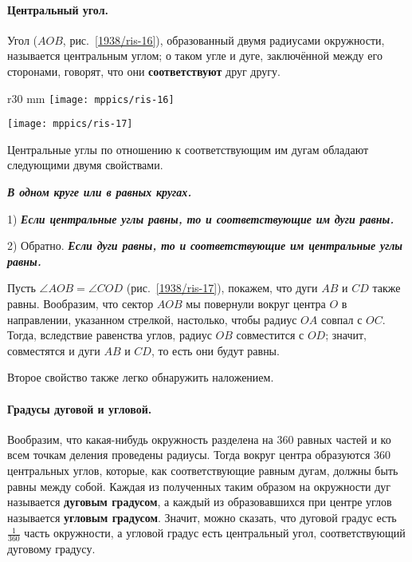 \paragraph{Центральный угол.}\label{1938/17}
Угол ($AOB$, рис.~\ref{1938/ris-16}), образованный двумя радиусами окружности, называется центральным углом;
о таком угле и дуге, заключённой между его сторонами, говорят, что они \textbf{соответствуют} друг другу.

\begin{wrapfigure}{r}{30 mm}
\vskip-4mm
\centering
\texttt{[image: mppics/ris-16]}
\caption{}\label{1938/ris-16}
\bigskip
\texttt{[image: mppics/ris-17]}
\caption{}\label{1938/ris-17}
\end{wrapfigure}

Центральные углы по отношению к соответствующим им дугам обладают следующими двумя свойствами.

\textbf{\emph{В одном круге или в равных кругах.}}

1) \textbf{\emph{Если центральные углы равны, то и соответствующие им дуги равны.}}

2) Обратно.
\textbf{\emph{Если дуги равны, то и соответствующие им центральные углы равны.}}


Пусть $\angle AOB=\angle COD$ (рис.~\ref{1938/ris-17}), покажем, что дуги $AB$ и $CD$ также равны.
Вообразим, что сектор $AOB$ мы повернули вокруг центра $O$ в направлении, указанном стрелкой, настолько, чтобы радиус $OA$ совпал с $OC$.
Тогда, вследствие равенства углов, радиус $OB$ совместится с $OD$;
значит, совместятся и дуги $AB$ и $CD$, то есть
они будут равны.

Второе свойство также легко обнаружить наложением.

\paragraph{Градусы дуговой и угловой.}\label{1938/18}
Вообразим, что какая-нибудь окружность разделена на 360 равных частей и ко всем точкам деления проведены радиусы.
Тогда вокруг центра образуются 360 центральных углов, которые, как соответствующие равным дугам, должны быть равны между собой.
Каждая из полученных таким образом на окружности дуг называется \textbf{дуговым градусом}, а каждый из образовавшихся при центре углов называется \textbf{угловым градусом}.
Значит, можно сказать, что дуговой градус есть $\tfrac1{360}$ часть окружности,
а угловой градус есть центральный угол, соответствующий дуговому градусу.

